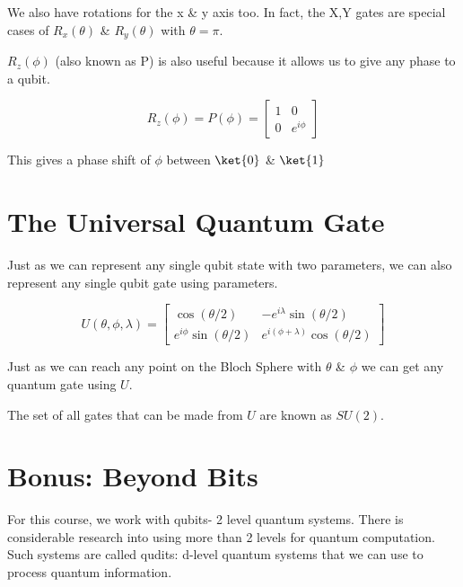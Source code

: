 \documentclass{book}
\begin{document}
We also have rotations for the x \& y axis too. In fact, the X,Y gates are special cases of $R_x(\theta)$ \& $R_y(\theta)$ with $\theta = \pi$. 

$R_z(\phi)$ (also known as P) is also useful because it allows us to give any phase to a qubit. 

$$
R_z(\phi) = P(\phi) = \begin{bmatrix} 1 & 0 \\ 0 & e^{i\phi} \end{bmatrix}
$$

This gives a phase shift of $\phi$ between $\ket{0}$ \& $\ket{1}$




\section{ The Universal Quantum Gate }

Just as we can represent any single qubit state with two parameters, we can also represent any single qubit gate using parameters. 

$$
U(\theta, \phi, \lambda) = \begin{bmatrix} \cos(\theta/2) & -e^{i\lambda}\sin(\theta/2) \\ e^{i\phi}\sin(\theta/2) & e^{i(\phi + \lambda)}\cos(\theta/2) \end{bmatrix} 
$$

Just as we can reach any point on the Bloch Sphere with $\theta$ \& $\phi$ we can get any quantum gate using $U$. 

The set of all gates that can be made from $U$ are known as $SU(2)$.




\section{ Bonus: Beyond Bits }

For this course, we work with qubits- 2 level quantum systems. There is considerable research into using more than 2 levels for quantum computation. Such systems are called qudits: d-level quantum systems that we can use to process quantum information. 
\end{document}
